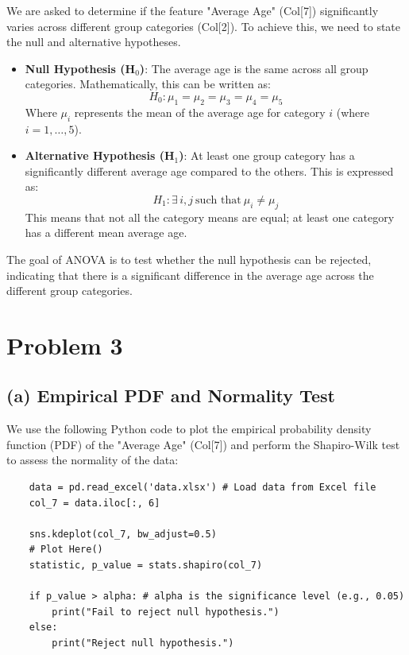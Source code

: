 \documentclass[12pt]{article}
\begin{document}
We are asked to determine if the feature "Average Age" (Col[7]) significantly varies across different group categories (Col[2]). To achieve this, we need to state the null and alternative hypotheses.

\begin{itemize}
    \item \textbf{Null Hypothesis (H$_0$)}: The average age is the same across all group categories. Mathematically, this can be written as:
    \[
    H_0: \mu_1 = \mu_2 = \mu_3 = \mu_4 = \mu_5
    \]
    Where $\mu_i$ represents the mean of the average age for category $i$ (where $i = 1, \dots, 5$).
    
    \item \textbf{Alternative Hypothesis (H$_1$)}: At least one group category has a significantly different average age compared to the others. This is expressed as:
    \[
    H_1: \exists \, i, j \ \text{such that} \ \mu_i \neq \mu_j
    \]
    This means that not all the category means are equal; at least one category has a different mean average age.
\end{itemize}

The goal of ANOVA is to test whether the null hypothesis can be rejected, indicating that there is a significant difference in the average age across the different group categories.


\section*{Problem 3}

\subsection*{(a) Empirical PDF and Normality Test}

We use the following Python code to plot the empirical probability density function (PDF) of the "Average Age" (Col[7]) and perform the Shapiro-Wilk test to assess the normality of the data:

\begin{verbatim}
    data = pd.read_excel('data.xlsx') # Load data from Excel file
    col_7 = data.iloc[:, 6]  

    sns.kdeplot(col_7, bw_adjust=0.5)
    # Plot Here()
    statistic, p_value = stats.shapiro(col_7) 

    if p_value > alpha: # alpha is the significance level (e.g., 0.05)
        print("Fail to reject null hypothesis.")
    else:
        print("Reject null hypothesis.")

\end{verbatim}
\end{document}
